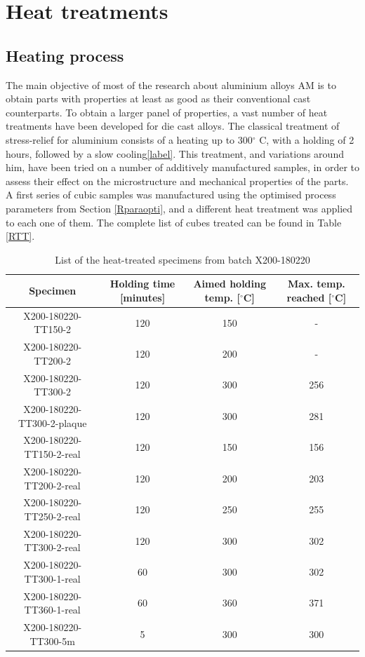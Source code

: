 \section{Heat treatments}


\subsection{Heating process}

The main objective of most of the research about aluminium alloys AM is to obtain parts with properties at least as good as their conventional cast counterparts. To obtain a larger panel of properties, a vast number of heat treatments have been developed for die cast alloys. The classical treatment of stress-relief for aluminium consists of a heating up to 300$^\circ$ C, with a holding of 2 hours, followed by a slow cooling\ref{label}. This treatment, and variations around him, have been tried on a number of additively manufactured samples, in order to assess their effect on the microstructure and mechanical properties of the parts.\\

A first series of cubic samples was manufactured using the optimised process parameters from Section \ref{Rparaopti}, and a different heat treatment was applied to each one of them. The complete list of cubes treated can be found in Table \ref{RTT}.

\begin{center}
\begin{table}[ht]
\begin{tabular}{|c|c|c|c|}
	\hline 
	Specimen & Holding time [minutes] & Aimed holding temp. [$^\circ$C] & Max. temp. reached [$^\circ$C] \\ 
	\hline 
	X200-180220-TT150-2 & 120 & 150 & - \\ 
	\hline 
	X200-180220-TT200-2 & 120 & 200 & - \\ 
	\hline 
	X200-180220-TT300-2 & 120 & 300 & 256 \\ 
	\hline 
	X200-180220-TT300-2-plaque & 120 & 300 & 281 \\ 
	\hline 
	X200-180220-TT150-2-real & 120 & 150 & 156 \\ 
	\hline 
	X200-180220-TT200-2-real & 120 &200  & 203 \\ 
	\hline 
	X200-180220-TT250-2-real & 120 & 250 & 255 \\ 
	\hline 
	X200-180220-TT300-2-real & 120 & 300 & 302 \\ 
	\hline 
	X200-180220-TT300-1-real & 60 & 300 & 302 \\ 
	\hline 
	X200-180220-TT360-1-real & 60 & 360 & 371 \\ 
	\hline 
	X200-180220-TT300-5m & 5 & 300 & 300 \\ 
	\hline 
\end{tabular} 
\caption[List of the heat-treated specimens from batch X200-180220]{List of the heat-treated specimens from batch X200-180220}
\label{tab:RTT}
\end{table}
\end{center}


